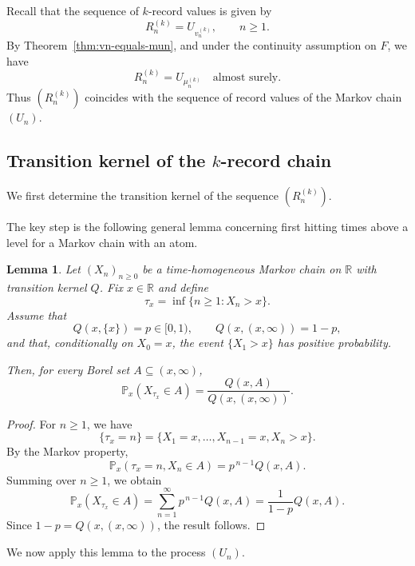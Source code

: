 \documentclass[12pt]{article}
\newtheorem{lemma}[theorem]{Lemma}
\theoremstyle{definition}
\begin{document}
Recall that the sequence of $k$-record values is given by
\[
R_n^{(k)} = U_{v_n^{(k)}}, \qquad n\ge1.
\]
By Theorem~\ref{thm:vn-equals-mun}, and under the continuity assumption on $F$, we have
\[
R_n^{(k)} = U_{\mu_n^{(k)}} \quad \text{almost surely}.
\]
Thus $(R_n^{(k)})$ coincides with the sequence of record values of the Markov chain $(U_n)$.

\subsection{Transition kernel of the $k$-record chain}
\label{subsec:transition-kernel}

We first determine the transition kernel of the sequence $(R_n^{(k)})$.

The key step is the following general lemma concerning first hitting times above a level for a Markov chain with an atom.

\begin{lemma}
\label{lem:hitting-time-kernel}
Let $(X_n)_{n\ge0}$ be a time-homogeneous Markov chain on $\mathbb{R}$ with transition kernel $Q$. Fix $x\in\mathbb{R}$ and define
\[
\tau_x = \inf\{n\ge1 : X_n > x\}.
\]
Assume that
\[
Q(x,\{x\}) = p \in [0,1), \qquad Q(x,(x,\infty)) = 1-p,
\]
and that, conditionally on $X_0=x$, the event $\{X_1>x\}$ has positive probability.

Then, for every Borel set $A\subseteq (x,\infty)$,
\[
\mathbb{P}_x(X_{\tau_x}\in A)
=
\frac{Q(x,A)}{Q(x,(x,\infty))}.
\]
\end{lemma}

\begin{proof}
For $n\ge1$, we have
\[
\{ \tau_x = n \}
=
\{X_1 = x, \dots, X_{n-1}=x, X_n > x\}.
\]
By the Markov property,
\[
\mathbb{P}_x(\tau_x = n, X_n \in A)
=
p^{\,n-1} Q(x,A).
\]
Summing over $n\ge1$, we obtain
\[
\mathbb{P}_x(X_{\tau_x}\in A)
=
\sum_{n=1}^\infty p^{\,n-1} Q(x,A)
=
\frac{1}{1-p} Q(x,A).
\]
Since $1-p = Q(x,(x,\infty))$, the result follows.
\end{proof}

\medskip

We now apply this lemma to the process $(U_n)$.
\end{document}
